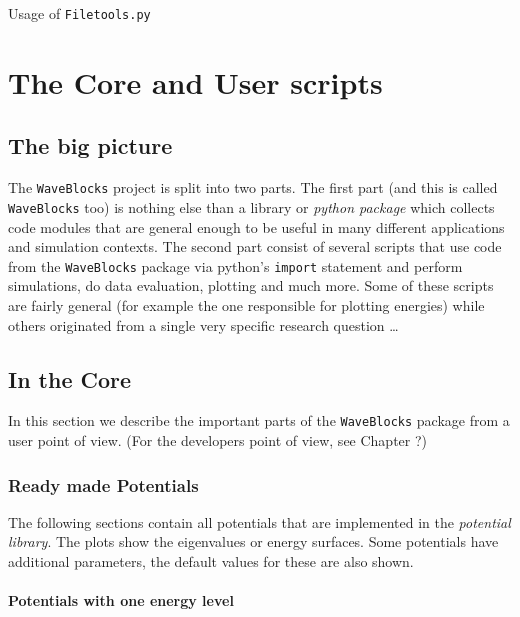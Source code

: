 \documentclass[a4paper,10pt]{report}
\begin{document}
Usage of \texttt{Filetools.py}









\chapter{The Core and User scripts}

\section{The big picture}

The \texttt{WaveBlocks} project is split into two parts. The first part (and this
is called \texttt{WaveBlocks} too) is nothing else than a library or \emph{python package}
which collects code modules that are general enough to be useful in many different applications
and simulation contexts. The second part consist of several scripts that use code
from the \texttt{WaveBlocks} package via python's \texttt{import} statement and
perform simulations, do data evaluation, plotting and much more. Some of these
scripts are fairly general (for example the one responsible for plotting energies)
while others originated from a single very specific research question \ldots

\section{In the Core}

In this section we describe the important parts of the \texttt{WaveBlocks} package
from a user point of view. (For the developers point of view, see Chapter ?)

\subsection{Ready made Potentials}
\label{sec:ready_made_potentials}

The following sections contain all potentials that are implemented in the
\emph{potential library}. The plots show the eigenvalues or energy surfaces.
Some potentials have additional parameters, the default values for these are
also shown.

\subsubsection{Potentials with one energy level}
\end{document}
